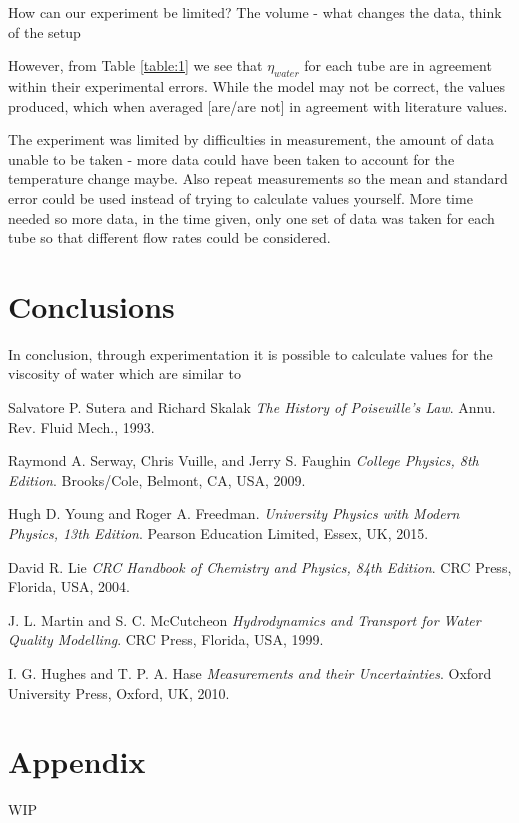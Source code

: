 \documentclass[twocolumn]{revtex4}
\begin{document}
How can our experiment be limited? The volume - what changes the data, think of the setup  


However, from Table \ref{table:1} we see that $\eta_{water}$ for each tube are in agreement within their experimental errors. While the model may not be correct, the values produced, which when averaged [are/are not] in agreement with literature values. 


The experiment was limited by difficulties in measurement, the amount of data unable to be taken - more data could have been taken to account for the temperature change maybe. Also repeat measurements so the mean and standard error could be used instead of trying to calculate values yourself. More time needed so more data, in the time given, only one set of data was taken for each tube so that different flow rates could be considered. 

\vspace{-5ex}
\section{Conclusions}
\vspace{-2ex}
 
In conclusion, through experimentation it is possible to calculate values for the viscosity of water which are similar to 

\begin{thebibliography}{5}
	Salvatore P. Sutera and Richard Skalak
	\textit{The History of Poiseuille's Law}.
	Annu. Rev. Fluid Mech., 1993.
	
	Raymond A. Serway, Chris Vuille, and Jerry S. Faughin
	\textit{College Physics, 8th Edition}.
	Brooks/Cole, Belmont, CA, USA, 2009.

	Hugh D. Young and Roger A. Freedman.
	\textit{University Physics with Modern Physics, 13th Edition}. 
	Pearson Education Limited, Essex, UK, 2015.
	
	David R. Lie
	\textit{CRC Handbook of Chemistry and Physics, 84th Edition}. 
	CRC Press, Florida, USA, 2004.
	
	J. L. Martin and S. C. McCutcheon
	\textit{Hydrodynamics and Transport for Water Quality Modelling}. 
	CRC Press, Florida, USA, 1999.
	
	I. G. Hughes and T. P. A. Hase
	\textit{Measurements and their Uncertainties}. 
	Oxford University Press, Oxford, UK, 2010.
	
\end{thebibliography}
\clearpage

\vfill
\twocolumngrid
\vspace{-3ex}
\section*{Appendix}
\vspace{-2ex}

WIP

\clearpage
\end{document}
